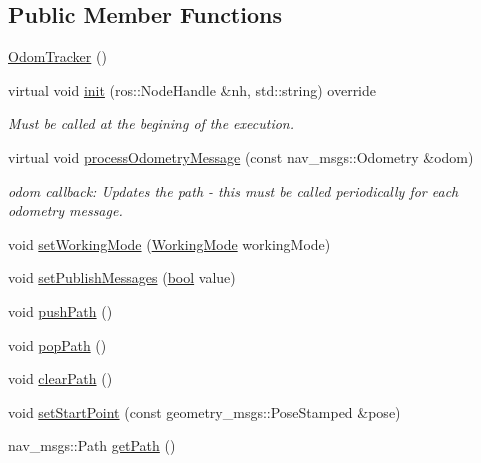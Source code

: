 \subsection*{Public Member Functions}
\begin{DoxyCompactItemize}
\item 
\hyperlink{classsmacc__odom__tracker_1_1OdomTracker_a7d9920de9aa3624896b206da2c28f070}{Odom\+Tracker} ()
\item 
virtual void \hyperlink{classsmacc__odom__tracker_1_1OdomTracker_aa4525024fdc01e54bc310f48c7676a2f}{init} (ros\+::\+Node\+Handle \&nh, std\+::string) override
\begin{DoxyCompactList}\small\item\em Must be called at the begining of the execution. \end{DoxyCompactList}\item 
virtual void \hyperlink{classsmacc__odom__tracker_1_1OdomTracker_adef7b87ba453ca86886239d875344de1}{process\+Odometry\+Message} (const nav\+\_\+msgs\+::\+Odometry \&odom)
\begin{DoxyCompactList}\small\item\em odom callback\+: Updates the path -\/ this must be called periodically for each odometry message. \end{DoxyCompactList}\item 
void \hyperlink{classsmacc__odom__tracker_1_1OdomTracker_a38fbca999297c46dc95628cc60851a45}{set\+Working\+Mode} (\hyperlink{namespacesmacc__odom__tracker_ade9730dd5cc10ccfad9362176cf46c33}{Working\+Mode} working\+Mode)
\item 
void \hyperlink{classsmacc__odom__tracker_1_1OdomTracker_a5808c41a9d8d75a70ec66fa581af4570}{set\+Publish\+Messages} (\hyperlink{classbool}{bool} value)
\item 
void \hyperlink{classsmacc__odom__tracker_1_1OdomTracker_a01194bc1bd8095929c61fc912a44e534}{push\+Path} ()
\item 
void \hyperlink{classsmacc__odom__tracker_1_1OdomTracker_a915623e872cc34912c8d50cffd9551f2}{pop\+Path} ()
\item 
void \hyperlink{classsmacc__odom__tracker_1_1OdomTracker_a81ef228f0c2659e1bf9f8fdcb03fc7ae}{clear\+Path} ()
\item 
void \hyperlink{classsmacc__odom__tracker_1_1OdomTracker_a5ac7c4770b3e29b74571ef65377048ee}{set\+Start\+Point} (const geometry\+\_\+msgs\+::\+Pose\+Stamped \&pose)
\item 
nav\+\_\+msgs\+::\+Path \hyperlink{classsmacc__odom__tracker_1_1OdomTracker_ace0762f93bc272a426d3038f74dc8752}{get\+Path} ()
\end{DoxyCompactItemize}
